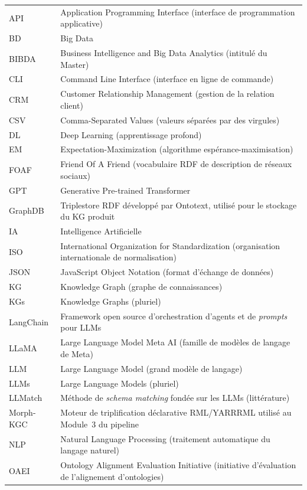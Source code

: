 \begin{longtable}{p{3.2cm} p{10.8cm}}
API       & Application Programming Interface (interface de programmation applicative) \\
BD        & Big Data \\
BIBDA     & Business Intelligence and Big Data Analytics (intitulé du Master) \\
CLI       & Command Line Interface (interface en ligne de commande) \\
CRM       & Customer Relationship Management (gestion de la relation client) \\
CSV       & Comma-Separated Values (valeurs séparées par des virgules) \\
DL        & Deep Learning (apprentissage profond) \\
EM        & Expectation-Maximization (algorithme espérance-maximisation) \\
FOAF      & Friend Of A Friend (vocabulaire RDF de description de réseaux sociaux) \\
GPT       & Generative Pre-trained Transformer \\
GraphDB   & Triplestore RDF développé par Ontotext, utilisé pour le stockage du KG produit \\
IA        & Intelligence Artificielle \\
ISO       & International Organization for Standardization (organisation internationale de normalisation) \\
JSON      & JavaScript Object Notation (format d'échange de données) \\
KG        & Knowledge Graph (graphe de connaissances) \\
KGs       & Knowledge Graphs (pluriel) \\
LangChain & Framework open source d'orchestration d'agents et de \textit{prompts} pour LLMs \\
LLaMA     & Large Language Model Meta AI (famille de modèles de langage de Meta) \\
LLM       & Large Language Model (grand modèle de langage) \\
LLMs      & Large Language Models (pluriel) \\
LLMatch   & Méthode de \textit{schema matching} fondée sur les LLMs (littérature) \\
Morph-KGC & Moteur de triplification déclarative RML/YARRRML utilisé au Module~3 du pipeline \\
NLP       & Natural Language Processing (traitement automatique du langage naturel) \\
OAEI      & Ontology Alignment Evaluation Initiative (initiative d'évaluation de l'alignement d'ontologies) \\

\end{longtable}
